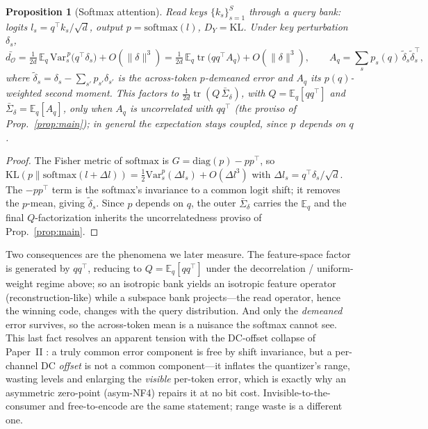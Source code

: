 \documentclass[lettersize,onecolumn]{IEEEtran}
\newtheorem{proposition}{Proposition}
\theoremstyle{definition}
\theoremstyle{remark}
\newcommand{\tr}{\operatorname{tr}}
\newcommand{\dO}{d_{\mathcal{O}}}
\newcommand{\E}{\mathbb{E}}
\begin{document}
\begin{proposition}[Softmax attention]\label{prop:softmax}
Read keys $\{k_s\}_{s=1}^{S}$ through a query bank: logits $l_s=q^\top k_s/\sqrt{d}$,
output $p=\mathrm{softmax}(l)$, $D_Y=\mathrm{KL}$. Under key perturbation $\delta_s$,
\[
\bar{\dO}=\tfrac{1}{2d}\,\E_q\,\mathrm{Var}^{\,p}_s\!\big(q^\top\delta_s\big)
+O(\|\delta\|^3)
=\tfrac{1}{2d}\,\E_q\tr\!\big(qq^\top A_q\big)+O(\|\delta\|^3),
\qquad A_q=\sum_s p_s(q)\,\tilde\delta_s\tilde\delta_s^\top,
\]
where $\tilde\delta_s=\delta_s-\sum_{s'}p_{s'}\delta_{s'}$ is the across-token
$p$-demeaned error and $A_q$ its $p(q)$-weighted second moment. This
\emph{factors} to $\tfrac{1}{2d}\tr(Q\,\bar\Sigma_\delta)$, with $Q=\E_q[qq^\top]$
and $\bar\Sigma_\delta=\E_q[A_q]$, \emph{only} when $A_q$ is uncorrelated with
$qq^\top$ (the proviso of Prop.~\ref{prop:main}); in general the expectation stays
coupled, since $p$ depends on $q$.
\end{proposition}
\begin{proof}
The Fisher metric of $\mathrm{softmax}$ is $G=\mathrm{diag}(p)-pp^\top$, so
$\mathrm{KL}(p\|\mathrm{softmax}(l+\Delta l))=\tfrac12\mathrm{Var}^p_s(\Delta l_s)
+O(\Delta l^3)$ with $\Delta l_s=q^\top\delta_s/\sqrt d$. The $-pp^\top$ term is the
softmax's invariance to a common logit shift; it removes the $p$-mean, giving
$\tilde\delta_s$. Since $p$ depends on $q$, the outer $\bar\Sigma_\delta$ carries the
$\E_q$ and the final $Q$-factorization inherits the uncorrelatedness proviso of
Prop.~\ref{prop:main}.
\end{proof}
Two consequences are the phenomena we later measure. The feature-space factor is
generated by $qq^\top$, reducing to $Q=\E_q[qq^\top]$ under the decorrelation /
uniform-weight regime above; so an isotropic bank yields an isotropic feature
operator (reconstruction-like) while a subspace bank projects---the read operator,
hence the winning code, changes with the query distribution. And only the
\emph{demeaned} error survives, so the across-token mean is a nuisance the softmax
cannot see. This last fact resolves an apparent tension with the DC-offset
collapse of Paper~II \cite{paper2}: a truly common error component is free by shift
invariance, but a per-channel DC \emph{offset} is not a common component---it inflates
the quantizer's range, wasting levels and enlarging the \emph{visible} per-token
error, which is exactly why an asymmetric zero-point (asym-NF4) repairs it at no bit
cost. Invisible-to-the-consumer and free-to-encode are the same statement; range
waste is a different one.
\end{document}

